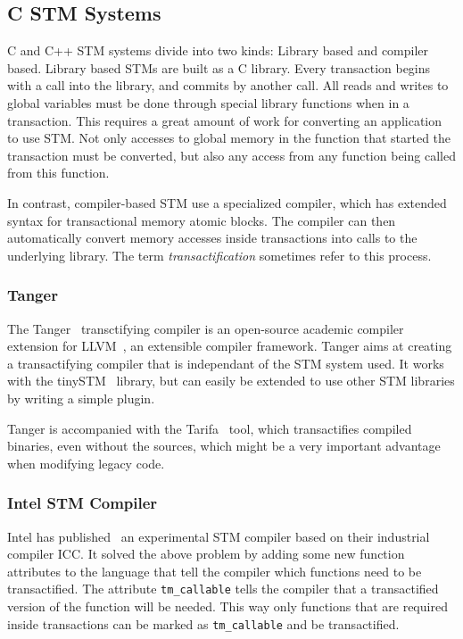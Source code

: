 \documentclass[preprint,11pt]{sigplanconf}
\let \cite = \citep
\begin{document}
\subsection{C STM Systems}
C and C++ STM systems divide into two kinds: Library based and compiler based.
Library based STMs \cite{TL2,felber2008tinystm,RSTM} are built as a C library.
Every transaction begins with a call into the library, and commits by another
call. All reads and writes to global variables must be done through special
library functions when in a transaction. This requires a great amount of work
for converting an application to use STM. Not only accesses to global memory in
the function that started the transaction must be converted, but also any access
from any function being called from this function. 

In contrast, compiler-based STM
\cite{felber2007tanger,icc,gcctm,baek:opentm:pact:2007} use a specialized
compiler, which has extended syntax for transactional memory atomic blocks. The
compiler can then automatically convert memory accesses inside transactions
into calls to the underlying library. The term \emph{transactification}
sometimes refer to this process.

\subsubsection{\sc Tanger}
The {\sc Tanger}~\cite{felber2007tanger} transctifying compiler is an
open-source academic compiler extension for LLVM~\cite{LLVM:CGO04}, an
extensible compiler framework.  Tanger aims at creating a transactifying
compiler that is independant of the STM system used. It works with the
tinySTM~\cite{felber2008tinystm} library, but can easily be extended to use
other STM libraries by writing a simple plugin.

{\sc Tanger} is accompanied with the {\sc Tarifa}~\cite{felber2007tanger}
tool, which transactifies compiled binaries, even without the sources, which
might be a very important advantage when modifying legacy code.

\subsubsection{Intel STM Compiler}
Intel has published~\cite{icc} an experimental STM compiler based on their industrial
compiler ICC. It solved the above problem by adding some new function attributes
to the language that tell the compiler which functions need to be transactified.
The attribute {\tt tm\_callable} tells the compiler that a transactified version
of the function will be needed. This way only functions that are required inside
transactions can be marked as {\tt tm\_callable} and be transactified.
\end{document}
